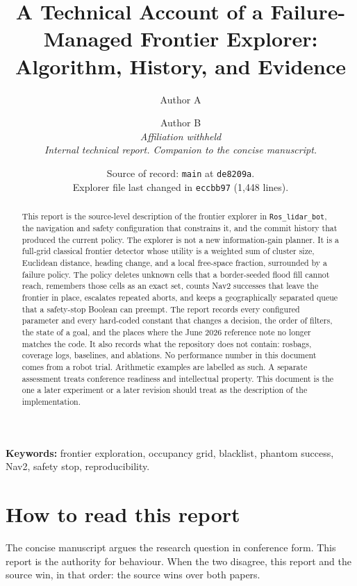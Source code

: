\documentclass[11pt]{article}
\title{A Technical Account of a Failure-Managed Frontier Explorer:\\Algorithm, History, and Evidence}
\author{Author A \and Author B\\[0.4em]
\textit{Affiliation withheld}\\
\textit{Internal technical report. Companion to the concise manuscript.}}
\date{Source of record: \texttt{main} at \texttt{de8209a}.\\
Explorer file last changed in \texttt{eccbb97} (1{,}448 lines).}
\begin{document}
\maketitle

\begin{abstract}
This report is the source-level description of the frontier explorer in \texttt{Ros\_lidar\_bot}, the navigation and safety configuration that constrains it, and the commit history that produced the current policy. The explorer is not a new information-gain planner. It is a full-grid classical frontier detector whose utility is a weighted sum of cluster size, Euclidean distance, heading change, and a local free-space fraction, surrounded by a failure policy. The policy deletes unknown cells that a border-seeded flood fill cannot reach, remembers those cells as an exact set, counts Nav2 successes that leave the frontier in place, escalates repeated aborts, and keeps a geographically separated queue that a safety-stop Boolean can preempt. The report records every configured parameter and every hard-coded constant that changes a decision, the order of filters, the state of a goal, and the places where the June 2026 reference note no longer matches the code. It also records what the repository does not contain: rosbags, coverage logs, baselines, and ablations. No performance number in this document comes from a robot trial. Arithmetic examples are labelled as such. A separate assessment treats conference readiness and intellectual property. This document is the one a later experiment or a later revision should treat as the description of the implementation.
\end{abstract}

\noindent\textbf{Keywords:} frontier exploration, occupancy grid, blacklist, phantom success, Nav2, safety stop, reproducibility.

\tableofcontents
\newpage

\section{How to read this report}
The concise manuscript argues the research question in conference form. This report is the authority for behaviour. When the two disagree, this report and the source win, in that order: the source wins over both papers.
\end{document}
